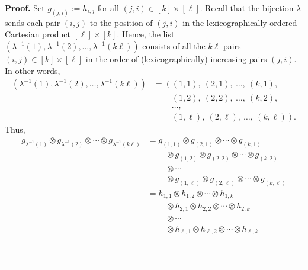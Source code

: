 \documentclass[numbers=enddot,12pt,final,onecolumn,notitlepage]{scrartcl}%
\theoremstyle{definition}
\newenvironment{proof}[1][Proof]{\noindent\textbf{#1.} }{\ \rule{0.5em}{0.5em}}
\begin{document}
\begin{proof}
Set $g_{\left(  j,i\right)  }:=h_{i,j}$ for all $\left(  j,i\right)
\in\left[  k\right]  \times\left[  \ell\right]  $. Recall that the bijection
$\lambda$ sends each pair $\left(  i,j\right)  $ to the position of $\left(
j,i\right)  $ in the lexicographically ordered Cartesian product $\left[
\ell\right]  \times\left[  k\right]  $. Hence, the list $\left(  \lambda
^{-1}\left(  1\right)  ,\lambda^{-1}\left(  2\right)  ,\ldots,\lambda
^{-1}\left(  k\ell\right)  \right)  $ consists of all the $k\ell$ pairs
$\left(  i,j\right)  \in\left[  k\right]  \times\left[  \ell\right]  $ in the
order of (lexicographically) increasing pairs $\left(  j,i\right)  $. In other
words,%
\begin{align*}
\left(  \lambda^{-1}\left(  1\right)  ,\lambda^{-1}\left(  2\right)
,\ldots,\lambda^{-1}\left(  k\ell\right)  \right)   &  =\left(  \left(
1,1\right)  ,\ \left(  2,1\right)  ,\ \ldots,\ \left(  k,1\right)  ,\right. \\
&  \ \ \ \ \ \ \ \ \ \ \left.  \left(  1,2\right)  ,\ \left(  2,2\right)
,\ \ldots,\ \left(  k,2\right)  ,\right. \\
&  \ \ \ \ \ \ \ \ \ \ \left.  \ldots,\right. \\
&  \ \ \ \ \ \ \ \ \ \ \left.  \left(  1,\ell\right)  ,\ \left(
2,\ell\right)  ,\ \ldots,\ \left(  k,\ell\right)  \right)  .
\end{align*}
Thus,%
\begin{align*}
g_{\lambda^{-1}\left(  1\right)  }\otimes g_{\lambda^{-1}\left(  2\right)
}\otimes\cdots\otimes g_{\lambda^{-1}\left(  k\ell\right)  }  &  =g_{\left(
1,1\right)  }\otimes g_{\left(  2,1\right)  }\otimes\cdots\otimes g_{\left(
k,1\right)  }\\
&  \ \ \ \ \ \ \ \ \ \ \otimes g_{\left(  1,2\right)  }\otimes g_{\left(
2,2\right)  }\otimes\cdots\otimes g_{\left(  k,2\right)  }\\
&  \ \ \ \ \ \ \ \ \ \ \otimes\cdots\\
&  \ \ \ \ \ \ \ \ \ \ \otimes g_{\left(  1,\ell\right)  }\otimes g_{\left(
2,\ell\right)  }\otimes\cdots\otimes g_{\left(  k,\ell\right)  }\\
&  =h_{1,1}\otimes h_{1,2}\otimes\cdots\otimes h_{1,k}\\
&  \ \ \ \ \ \ \ \ \ \ \otimes h_{2,1}\otimes h_{2,2}\otimes\cdots\otimes
h_{2,k}\\
&  \ \ \ \ \ \ \ \ \ \ \otimes\cdots\\
&  \ \ \ \ \ \ \ \ \ \ \otimes h_{\ell,1}\otimes h_{\ell,2}\otimes
\cdots\otimes h_{\ell,k}%
\end{align*}

\end{proof}
\end{document}

